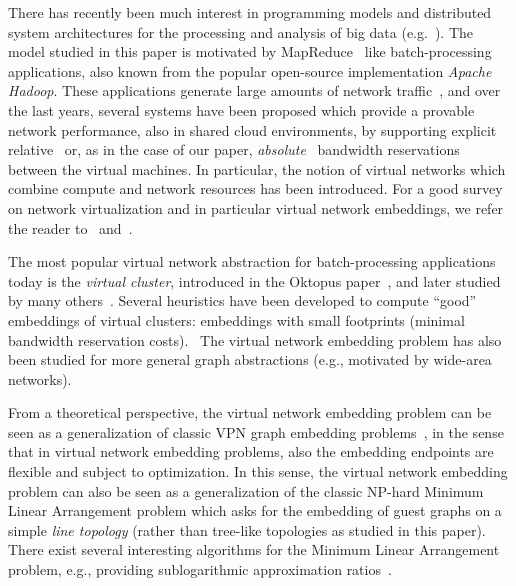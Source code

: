 \documentclass[9pt]{sigcomm-alternate}
\begin{document}
There has recently been much interest in programming models and distributed
system architectures for the processing and analysis of big data (e.g.~\cite{nodb,mapreduce,shark}). The model studied in
this paper is motivated by MapReduce~\cite{mapreduce} like batch-processing applications, also known
from the popular open-source implementation \emph{Apache Hadoop}.
These applications
generate large amounts of network traffic~\cite{orchestra,talk-about,amazonbw},
and over the last years, several systems have been proposed which provide
a provable network performance, also in shared cloud environments, by supporting explicit
relative~\cite{faircloud,elasticswitch,seawall}
or, as in the case of our paper, \emph{absolute}~\cite{oktopus,secondnet,drl,gatekeeper,proteus} bandwidth reservations
between the virtual machines.
In particular, the notion of virtual networks which combine compute and network resources has been introduced.
For a good survey on network virtualization and in particular virtual network embeddings,
we refer the reader to~\cite{boutaba-survey} and~\cite{fischer-survey}.

The most popular virtual network abstraction for batch-processing applications today is the \emph{virtual cluster},
introduced in the Oktopus paper~\cite{oktopus}, and later studied by many others~\cite{talk-about,proteus}.
Several heuristics have been developed to compute ``good'' embeddings of virtual clusters: embeddings
with small footprints (minimal bandwidth reservation costs).~\cite{oktopus,talk-about,proteus}
The virtual network embedding problem has also been studied for more general graph abstractions
(e.g., motivated by wide-area networks).~\cite{infocom2009,ammar,turner,simannealing,ucc12mip,zhu06}

From a theoretical perspective, the virtual network embedding problem can be seen as a generalization
of classic VPN graph embedding problems~\cite{Goyal2008,gupta2001provisioning},
in the sense that in virtual network embedding problems, also the embedding endpoints are flexible and subject to optimization.
In this sense, the virtual network embedding problem can also be seen as a generalization of the
classic NP-hard Minimum Linear Arrangement problem which asks for the
embedding of guest graphs on a simple \emph{line topology} (rather than tree-like topologies as
studied in this paper).~\cite{mla,mla-survey}
There exist several interesting algorithms for the Minimum Linear Arrangement problem,
e.g., providing sublogarithmic approximation ratios~\cite{mla-feige}.
\end{document}
